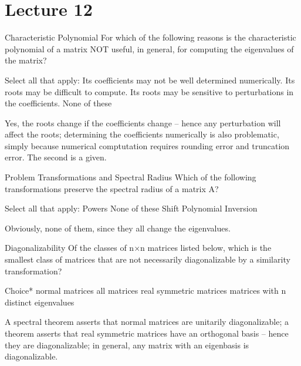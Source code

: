 \documentclass[../main.tex]{subfiles}
\begin{document}
\section{Lecture 12}

\begin{problem}
    Characteristic Polynomial
For which of the following reasons is the characteristic polynomial of a matrix NOT useful, in general, for computing the eigenvalues of the matrix?

Select all that apply:
Its coefficients may not be well determined numerically.
Its roots may be difficult to compute.
Its roots may be sensitive to perturbations in the coefficients.
None of these
\end{problem}

\begin{solution}
    Yes, the roots change if the coefficients change -- hence any perturbation will affect the roots; determining the coefficients numerically is also problematic, simply because numerical comptutation requires rounding error and truncation error. The second is a given.
\end{solution}

\begin{problem}
    Problem Transformations and Spectral Radius
Which of the following transformations preserve the spectral radius of a matrix A?

Select all that apply:
Powers
None of these
Shift
Polynomial
Inversion
\end{problem}
\begin{solution}
    Obviously, none of them, since they all change the eigenvalues.
\end{solution}

\begin{problem}
    Diagonalizability
Of the classes of n×n matrices listed below, which is the smallest class of matrices that are not necessarily diagonalizable by a similarity transformation?

Choice*
normal matrices
all matrices
real symmetric matrices
matrices with n distinct eigenvalues
\end{problem}
\begin{solution}
    A spectral theorem asserts that normal matrices are unitarily diagonalizable; a theorem asserts that real symmetric matrices have an orthogonal basis -- hence they are diagonalizable; in general, any matrix with an eigenbasis is diagonalizable.
\end{solution}
\end{document}
